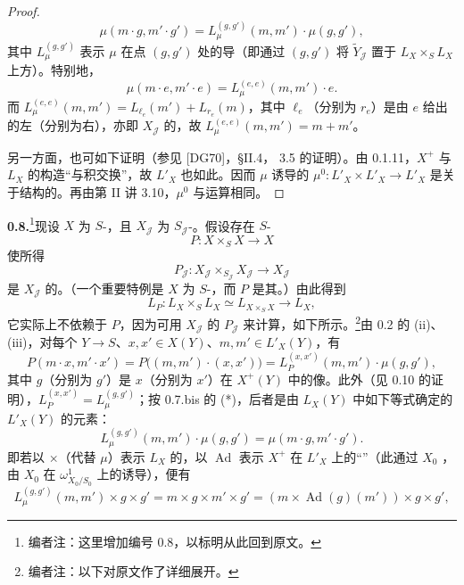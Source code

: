 \begin{proof}
\[\mu(m\cdot g,m'\cdot g')=L_\mu^{(g,g')}(m,m')\cdot\mu(g,g'),\tag{*}\]
其中 $L_\mu^{(g,g')}$ 表示 $\mu$ 在点 $(g,g')$ 处的导（即通过 $(g,g')$ 将 $\widetilde Y_{\mathcal J}$ 置于 $L_X\times_S L_X$ 上方）。特别地，
\[\mu(m\cdot e,m'\cdot e)=L_\mu^{(e,e)}(m,m')\cdot e.\]
而 $L_\mu^{(e,e)}(m,m')=L_{\ell_e}(m')+L_{r_e}(m)$，其中 $\ell_e$（分别为 $r_e$）是由 $e$ 给出的左（分别为右），亦即 $X_{\mathcal J}$ 的，故 $L_\mu^{(e,e)}(m,m')=m+m'$。

另一方面，也可如下证明（参见 [DG70]，§II.4， 3.5 的证明）。由 0.1.11，$X^+$ 与 $L_X$ 的构造“与积交换”，故 $L'_X$ 也如此。因而 $\mu$ 诱导的 $\mu^0:L'_X\times L'_X\to L'_X$ 是关于结构的。再由第 II 讲 3.10，$\mu^0$ 与运算相同。
\end{proof}
\textbf{0.8.}\footnote{编者注：这里增加编号 0.8，以标明从此回到原文。}现设 $X$ 为 $S$-，且 $X_{\mathcal J}$ 为 $S_{\mathcal J}$-。假设存在 $S$-
\[P:X\times_S X\longrightarrow X\]
使所得
\[P_{\mathcal J}:X_{\mathcal J}\times_{S_{\mathcal J}}X_{\mathcal J}\longrightarrow X_{\mathcal J}\]
是 $X_{\mathcal J}$ 的。（一个重要特例是 $X$ 为 $S$-，而 $P$ 是其。）由此得到
\[L_P:L_X\times_S L_X\simeq L_{X\times_S X}\longrightarrow L_X,\]
它实际上不依赖于 $P$，因为可用 $X_{\mathcal J}$ 的 $P_{\mathcal J}$ 来计算，如下所示。\footnote{编者注：以下对原文作了详细展开。}由 0.2 的 (ii)、(iii)，对每个 $Y\to S$、$x,x'\in X(Y)$、$m,m'\in L'_X(Y)$，有
\[P(m\cdot x,m'\cdot x')=P\bigl((m,m')\cdot(x,x')\bigr)=L_P^{(x,x')}(m,m')\cdot\mu(g,g'),\]
其中 $g$（分别为 $g'$）是 $x$（分别为 $x'$）在 $X^+(Y)$ 中的像。此外（见 0.10 的证明），$L_P^{(x,x')}=L_\mu^{(g,g')}$；按 0.7.bis 的 (*)，后者是由 $L_X(Y)$ 中如下等式确定的 $L'_X(Y)$ 的元素：
\[L_\mu^{(g,g')}(m,m')\cdot\mu(g,g')=\mu(m\cdot g,m'\cdot g').\]
即若以 $\times$（代替 $\mu$）表示 $L_X$ 的，以 $\operatorname{Ad}$ 表示 $X^+$ 在 $L'_X$ 上的“”（此通过 $X_0$ ，由 $X_0$ 在 $\omega^1_{X_0/S_0}$ 上的诱导），便有
\[L_\mu^{(g,g')}(m,m')\times g\times g'=m\times g\times m'\times g'=(m\times\operatorname{Ad}(g)(m'))\times g\times g',\]
